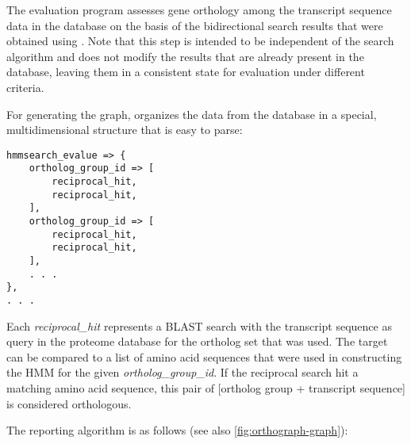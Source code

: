 \label{sec:algorithm-reporting}
The evaluation program  assesses gene orthology among
the transcript sequence data in the database on the basis of the bidirectional
search results that were obtained using . Note that
this step is intended to be independent of the search algorithm and does not
modify the results that are already present in the database, leaving them in a
consistent state for evaluation under different criteria.

For generating the graph,  organizes the data from the
database in a special, multidimensional structure that is easy to parse:

\begin{lstlisting}[label={lst:structure},caption={Data structure for parsing the triangular
relationships between ortholog groups and transcripts}]
hmmsearch_evalue => {
	ortholog_group_id => [
		reciprocal_hit,
		reciprocal_hit,
	],
	ortholog_group_id => [
		reciprocal_hit,
		reciprocal_hit,
	],
	. . .
},
. . .
\end{lstlisting}

Each \emph{reciprocal\_hit} represents a BLAST search with the transcript
sequence as query in the proteome database for the ortholog set that was used.
The target can be compared to a list of amino acid sequences that were used in
constructing the HMM for the given \emph{ortholog\_group\_id}. If the reciprocal
search hit a matching amino acid sequence, this pair of [ortholog group +
transcript sequence] is considered orthologous.

The reporting algorithm is as follows (see also \autoref{fig:orthograph-graph}):

